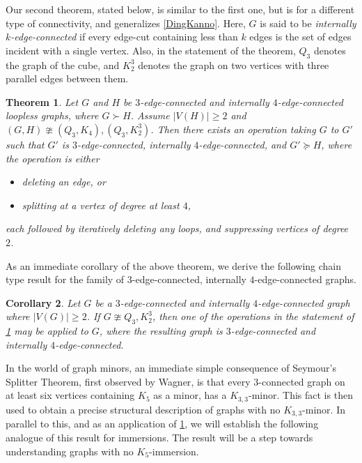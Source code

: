 \documentclass[letterpaper,11pt]{article}
\newtheorem{theorem}{Theorem}[section]
\newtheorem{cor}[theorem]{Corollary}
\theoremstyle{definition}
\begin{document}
Our second theorem, stated below, is similar to the first one, but is for a different type of connectivity, and generalizes \cref{DingKanno}. Here, $G$ is said to be \emph{internally $k$-edge-connected} if every edge-cut containing less than $k$ edges is the set of edges incident with a single vertex. Also, in the statement of the theorem, $Q_3$ denotes the graph of the cube, and $K_2^3$ denotes the graph on two vertices with three parallel edges between them.


\begin{theorem}
\label{sp-thm2intro}
Let $G$ and $H$ be $3$-edge-connected and internally $4$-edge-connected loopless graphs, where $G \succ H$. Assume $|V(H)|\ge 2$ and $(G, H) \ncong (Q_3, K_4), (Q_3, K_2^3)$. Then there exists an operation taking $G$ to $G'$ such that $G'$ is $3$-edge-connected, internally $4$-edge-connected, and $G' \succeq H$, where the operation is either
\begin{itemize}
\item deleting an edge, or
\item splitting at a vertex of degree at least $4$,
\end{itemize}
each followed by iteratively deleting any loops, and suppressing vertices of degree $2$.
\end{theorem}



As an immediate corollary of the above theorem, we derive the following chain type result for the family of $3$-edge-connected, internally $4$-edge-connected graphs.
\begin{cor}
	Let $G$ be a $3$-edge-connected and internally $4$-edge-connected graph where $|V(G)| \ge 2$. If $G\ncong Q_3, K_2^3$, then one of the operations in the statement of \cref{sp-thm2intro} may be applied to $G$, where the resulting graph is $3$-edge-connected and internally $4$-edge-connected.
\end{cor}

In the world of graph minors, an immediate simple consequence of Seymour's Splitter Theorem, first observed by Wagner\cite{MR1513158}, is that every $3$-connected graph on at least six vertices containing $K_5$ as a minor, has a $K_{3,3}$-minor. This fact is then used to obtain a precise structural description of graphs with no $K_{3,3}$-minor. In parallel to this, and as an application of  \cref{sp-thm2intro}, we will establish the following analogue of this result for immersions. The result will be a step towards understanding graphs with no $K_5$-immersion.
\end{document}
